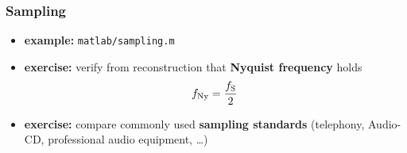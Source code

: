 \begin{frame}
	\frametitle{Sampling}
	\begin{itemize}
		\item \textbf{example:} \texttt{matlab/sampling.m}
			\begin{figure}
				\centering
				\begin{subfigure}[c]{0.48\linewidth}
				\end{subfigure}
				\hspace{0.01\linewidth}
				\begin{subfigure}[c]{0.48\linewidth}
				\end{subfigure}
			\end{figure}
		\item \textbf{exercise:} verify from reconstruction that \textbf{Nyquist frequency} holds
			\begin{align*}
				f_{\textrm{Ny}}=\frac{f_{\textrm S}}2
			\end{align*}
		\item \textbf{exercise:} compare commonly used \textbf{sampling standards} (telephony, Audio-CD, professional audio equipment, \ldots)
	\end{itemize}
\end{frame}

